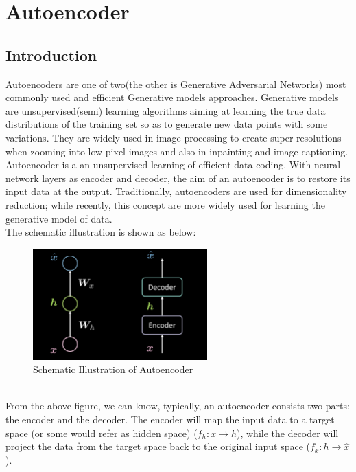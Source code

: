 \chapter{ Autoencoder }
\section{ Introduction }
Autoencoders are one of two(the other is Generative Adversarial Networks) most commonly used and efficient Generative models approaches. Generative models are unsupervised(semi) learning algorithms aiming at learning the true data distributions of the training set so as to generate new data points with some variations. They are widely used in image processing to create super resolutions when zooming into low pixel images and also in inpainting and image captioning.
\\
Autoencoder is a an unsupervised learning of efficient data coding. With neural network layers as encoder and decoder, the aim of an autoencoder is to restore its input data at the output. Traditionally, autoencoders are used for dimensionality reduction; while recently, this concept are more widely used for learning the generative model of data.
\\
The schematic illustration is shown as below:
\\
\begin{figure}[htb]
    \centering
    \includegraphics[width=0.6\textwidth]{labs/10/images/Schematic_Illustration_of_Autoencoder.png}
    \caption{Schematic Illustration of Autoencoder}
    \label{fig:Schematic_Illustration_of_Autoencoder}
\end{figure}
\\
From the above figure, we can know, typically, an autoencoder consists two parts: the encoder and the decoder. The encoder will map the input data to a target space (or some would refer as hidden space) ($f_h: x\rightarrow h$), while the decoder will project the data from the target space back to the original input space ($f_x: h\rightarrow \hat{x}$).
